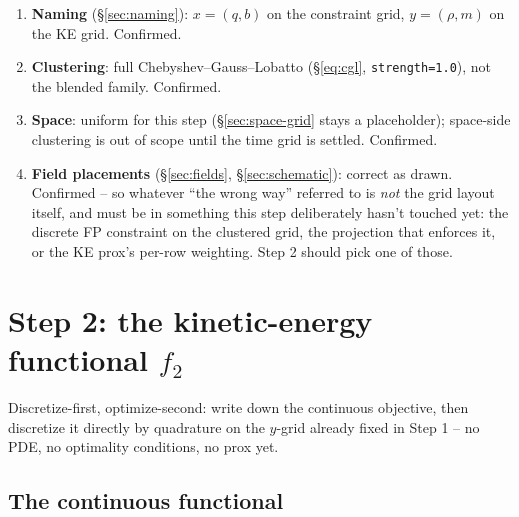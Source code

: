 \documentclass[11pt]{article}
\newcommand{\code}[1]{\texttt{#1}}
\begin{document}
\begin{enumerate}
  \item \textbf{Naming} (\S\ref{sec:naming}): $x=(q,b)$ on the constraint grid,
        $y=(\rho,m)$ on the KE grid. Confirmed.
  \item \textbf{Clustering}: full Chebyshev--Gauss--Lobatto (\S\ref{eq:cgl},
        \code{strength=1.0}), not the blended family. Confirmed.
  \item \textbf{Space}: uniform for this step (\S\ref{sec:space-grid} stays a
        placeholder); space-side clustering is out of scope until the time grid is
        settled. Confirmed.
  \item \textbf{Field placements} (\S\ref{sec:fields}, \S\ref{sec:schematic}): correct as
        drawn. Confirmed -- so whatever ``the wrong way'' referred to is \emph{not} the
        grid layout itself, and must be in something this step deliberately hasn't
        touched yet: the discrete FP constraint on the clustered grid, the projection
        that enforces it, or the KE prox's per-row weighting. Step 2 should pick one of
        those.
\end{enumerate}

\section{Step 2: the kinetic-energy functional $f_2$}
\label{sec:f2}

Discretize-first, optimize-second: write down the continuous objective, then discretize
it directly by quadrature on the $y$-grid already fixed in Step 1 -- no PDE, no
optimality conditions, no prox yet.

\subsection{The continuous functional}
\end{document}
